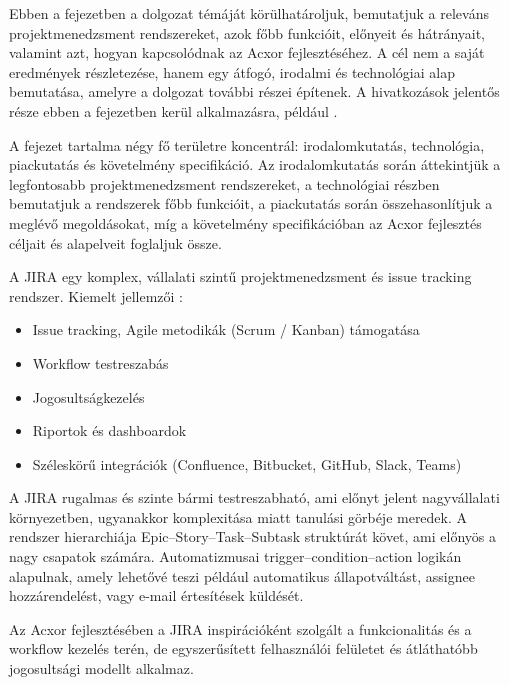 

Ebben a fejezetben a dolgozat témáját körülhatároljuk, bemutatjuk a releváns projektmenedzsment rendszereket, azok főbb funkcióit, előnyeit és hátrányait, valamint azt, hogyan kapcsolódnak az Acxor fejlesztéséhez. A cél nem a saját eredmények részletezése, hanem egy átfogó, irodalmi és technológiai alap bemutatása, amelyre a dolgozat további részei építenek. A hivatkozások jelentős része ebben a fejezetben kerül alkalmazásra, például \cite{coombs1987markup}.


A fejezet tartalma négy fő területre koncentrál: irodalomkutatás, technológia, piackutatás és követelmény specifikáció. Az irodalomkutatás során áttekintjük a legfontosabb projektmenedzsment rendszereket, a technológiai részben bemutatjuk a rendszerek főbb funkcióit, a piackutatás során összehasonlítjuk a meglévő megoldásokat, míg a követelmény specifikációban az Acxor fejlesztés céljait és alapelveit foglaljuk össze.



A JIRA egy komplex, vállalati szintű projektmenedzsment és issue tracking rendszer. Kiemelt jellemzői \cite{jira}:

\begin{itemize}
\item Issue tracking, Agile metodikák (Scrum / Kanban) támogatása
\item Workflow testreszabás
\item Jogosultságkezelés
\item Riportok és dashboardok
\item Széleskörű integrációk (Confluence, Bitbucket, GitHub, Slack, Teams)
\end{itemize}

A JIRA rugalmas és szinte bármi testreszabható, ami előnyt jelent nagyvállalati környezetben, ugyanakkor komplexitása miatt tanulási görbéje meredek. A rendszer hierarchiája Epic–Story–Task–Subtask struktúrát követ, ami előnyös a nagy csapatok számára. Automatizmusai trigger–condition–action logikán alapulnak, amely lehetővé teszi például automatikus állapotváltást, assignee hozzárendelést, vagy e-mail értesítések küldését.

Az Acxor fejlesztésében a JIRA inspirációként szolgált a funkcionalitás és a workflow kezelés terén, de egyszerűsített felhasználói felületet és átláthatóbb jogosultsági modellt alkalmaz.

